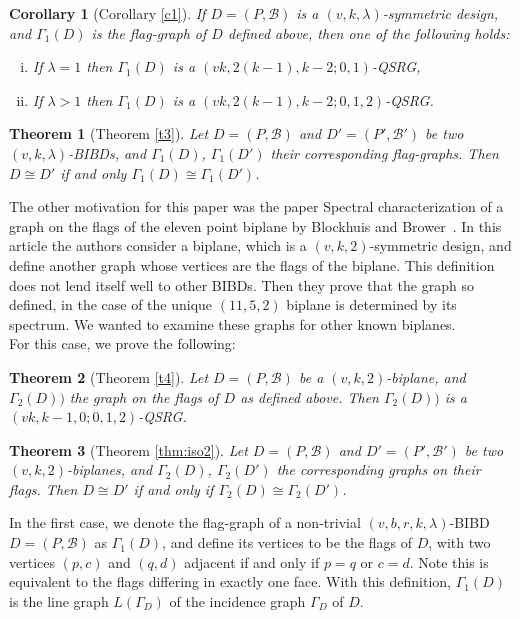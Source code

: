 \documentclass[letterpaper,10pt]{article}
\theoremstyle{plain}
\newtheorem*{thm*}{Theorem}
\newtheorem*{cor*}{Corollary}
\theoremstyle{definition}
\begin{document}
 \begin{cor*}[Corollary \ref{c1}]
 If $D=(P,\mathcal{B})$ is a $(v,k,\lambda)$-symmetric design, and $\Gamma_1(D)$ is the flag-graph of $D$ defined above, then one of the following holds:
 \begin{enumerate}[(i)]
     \item If $\lambda=1$ then $\Gamma_1(D)$ is a $(vk,2(k-1),k-2;0,1)$-QSRG,
     \item If $\lambda>1$ then $\Gamma_1(D)$ is a $(vk,2(k-1),k-2;0,1,2)$-QSRG.
 \end{enumerate}
 \end{cor*}

 \begin{thm*}[Theorem \ref{t3}]
  Let $D=(P,\mathcal{B})$ and $D'=(P',\mathcal{B}')$ be two $(v,k,\lambda)$-BIBDs, and $\Gamma_1(D)$, $\Gamma_1(D')$ their corresponding flag-graphs. Then $D\cong D'$ if and only $\Gamma_1(D)\cong\Gamma_1(D')$.  
\end{thm*}

The other motivation for this paper was the paper Spectral characterization of a graph on the flags of the eleven point biplane by Blockhuis and Brower~\cite{BB}. In this article the authors consider a biplane, which is a $(v,k,2)$-symmetric design, and define another graph whose vertices are the flags of the biplane. This definition does not lend itself well to other BIBDs. Then they prove that the graph so defined, in the case of the unique $(11,5,2)$ biplane is determined by its spectrum. We wanted to examine these graphs for other known biplanes.\\

For this case, we prove the following:\\

\begin{thm*}[Theorem \ref{t4}]
    Let $D=(P,\mathcal{B})$ be a $(v,k,2)$-biplane, and $\Gamma_2(D))$ the graph on the flags of $D$ as defined above. Then $\Gamma_2(D))$ is a $(vk,k-1,0;0,1,2)$-QSRG.
\end{thm*}

\begin{thm*}[Theorem \ref{thm:iso2}]
    Let $D=(P,\mathcal{B})$ and $D'=(P',\mathcal{B}')$ be two $(v,k,2)$-biplanes, and $\Gamma_2(D)$, $\Gamma_2(D')$ the corresponding graphs on their flags. Then $D\cong D'$ if and only if $\Gamma_2(D)\cong\Gamma_2(D')$.
\end{thm*}

In the first case, we denote the flag-graph of a non-trivial $(v,b,r,k,\lambda)$-BIBD $D=(P,\mathcal{B})$ as $\Gamma_1(D)$, and define its vertices to be the flags of $D$, with two vertices $(p,c)$ and $(q,d)$ adjacent if and only if $p=q$ or $c=d$. Note this is equivalent to the flags differing in exactly one face. With this definition, $\Gamma_1(D)$ is the line graph $L(\Gamma_D)$ of the incidence graph $\Gamma_D$ of $D$.\\
\end{document}
